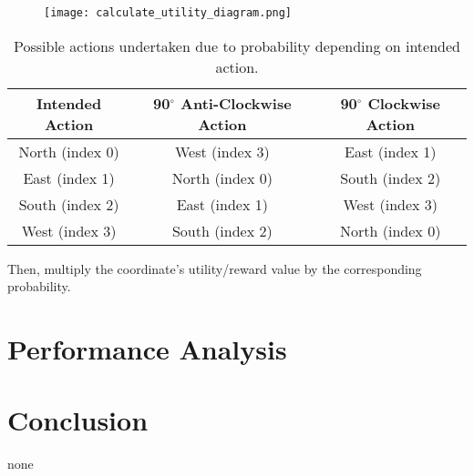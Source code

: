 \documentclass[a4paper]{report}
\begin{document}
        \begin{figure}[H]
          \centering
          \texttt{[image: calculate\_utility\_diagram.png]}
        \end{figure}
        \begin{table}[h!]
          \begin{center}
            \begin{tabular}{c|c|c}
              \textbf{Intended Action} & \textbf{90$^{\circ}$ Anti-Clockwise Action} & \textbf{90$^{\circ}$ Clockwise Action}\\
              \hline
              North (index 0) & West (index 3) & East (index 1)\\
              East (index 1) & North (index 0) & South (index 2)\\
              South (index 2) & East (index 1) & West (index 3)\\
              West (index 3) & South (index 2) & North (index 0)\\
            \end{tabular}
            \caption{Possible actions undertaken due to probability depending on intended action.}
            \label{tab:table1}
          \end{center}
        \end{table}
        Then, multiply the coordinate's utility/reward value by the corresponding probability.



  \section*{Performance Analysis}


  \section*{Conclusion}
  none
\end{document}
